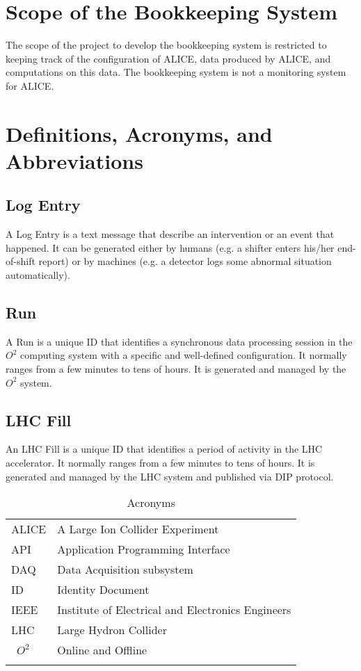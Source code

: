 \section{Scope of the Bookkeeping System}
The scope of the project to develop the bookkeeping system is restricted to keeping track of the configuration of ALICE, data produced by ALICE, and computations on this data. The bookkeeping system is not a monitoring system for ALICE.

\section{Definitions, Acronyms, and Abbreviations}

\subsection{Log Entry}
A Log Entry is a text message that describe an intervention or an event that happened. It can be generated either by humans (e.g. a shifter enters his/her end-of-shift report) or by machines (e.g. a detector logs some abnormal situation automatically). 

\subsection{Run}
A Run is a unique ID that identifies a synchronous data processing session in the $O^2$ computing system with a specific and well-defined configuration. It normally ranges from a few minutes to tens of hours. It is generated and managed by the $O^2$ system. 

\subsection{LHC Fill}
An LHC Fill is a unique ID that identifies a period of activity in the LHC accelerator. It normally ranges from a few minutes to tens of hours. It is generated and managed by the LHC system and published via DIP protocol. 
 
\begin{table} 
\begin{center}
\begin{longtable}{ll}
    ALICE & A Large Ion Collider Experiment\\
    API & Application Programming Interface\\
    DAQ & Data Acquisition subsystem \\
    ID & Identity Document\\
    IEEE & Institute of Electrical and Electronics Engineers\\
     LHC  & Large Hydron Collider\\\
     $O^2$ & Online and Offline\\
     
       & \\
    \end{longtable}
      \caption{Acronyms}
  \label{tab:acronyms}
  \end{center}
  
\end{table}




